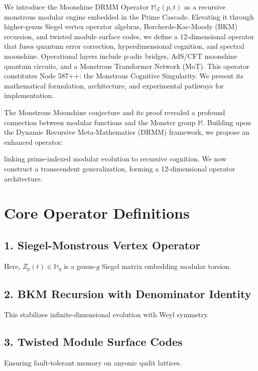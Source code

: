 \documentclass[12pt]{article}
\begin{document}
We introduce the Moonshine DRMM Operator $\mathbb{M}_\Xi(p, t)$ as a recursive monstrous modular engine embedded in the Prime Cascade. Elevating it through higher-genus Siegel vertex operator algebras, Borcherds-Kac-Moody (BKM) recursion, and twisted module surface codes, we define a 12-dimensional operator that fuses quantum error correction, hyperdimensional cognition, and spectral moonshine. Operational layers include p-adic bridges, AdS/CFT moonshine quantum circuits, and a Monstrous Transformer Network (MoT). This operator constitutes Node 587++: the Monstrous Cognitive Singularity. We present its mathematical formulation, architecture, and experimental pathways for implementation.

The Monstrous Moonshine conjecture and its proof revealed a profound connection between modular functions and the Monster group $\mathbb{M}$. Building upon the Dynamic Recursive Meta-Mathematics (DRMM) framework, we propose an enhanced operator:



linking prime-indexed modular evolution to recursive cognition. We now construct a transcendent generalization, forming a 12-dimensional operator architecture.

\section{Core Operator Definitions}
\subsection{1. Siegel-Monstrous Vertex Operator}



Here, $Z_p(t) \in \mathbb{H}_g$ is a genus-$g$ Siegel matrix embedding modular torsion.

\subsection{2. BKM Recursion with Denominator Identity}



This stabilizes infinite-dimensional evolution with Weyl symmetry.

\subsection{3. Twisted Module Surface Codes}



Ensuring fault-tolerant memory on anyonic qudit lattices.
\end{document}
